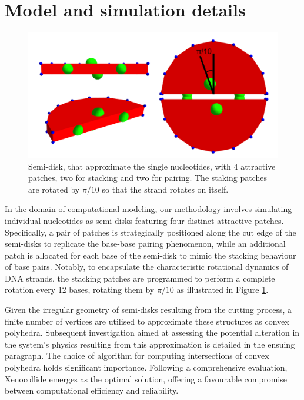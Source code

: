 \documentclass[aip,jcp, amsmath, amssymb, reprint]{revtex4-1}
\begin{document}
\section{\label{sec:level1}Model and simulation details}
\begin{figure}[h!]
\includegraphics[width=1\linewidth]{rota.png}
\caption{\label{fig:rota} Semi-disk, that approximate the single nucleotides, with 4 attractive patches, two for stacking and two for pairing. The staking patches are rotated by $\pi/10$ so that the strand rotates on itself.}
\end{figure}
In the domain of computational modeling, our methodology involves simulating individual nucleotides as semi-disks featuring four distinct attractive patches. Specifically, a pair of patches is strategically positioned along the cut edge of the semi-disks to replicate the base-base pairing phenomenon, while an additional patch is allocated for each base of the semi-disk to mimic the stacking behaviour of base pairs. Notably, to encapsulate the characteristic rotational dynamics of DNA strands, the stacking patches are programmed to perform a complete rotation every 12 bases, rotating them by $\pi/10$ as illustrated in Figure \ref{fig:rota}. 


Given the irregular geometry of semi-disks resulting from the cutting process, a finite number of vertices are utilised to approximate these structures as convex polyhedra. Subsequent investigation aimed at assessing the potential alteration in the system's physics resulting from this approximation is detailed in the ensuing paragraph. The choice of algorithm for computing intersections of convex polyhedra holds significant importance. Following a comprehensive evaluation, Xenocollide\cite{libccd} emerges as the optimal solution, offering a favourable compromise between computational efficiency and reliability.\\
\end{document}
